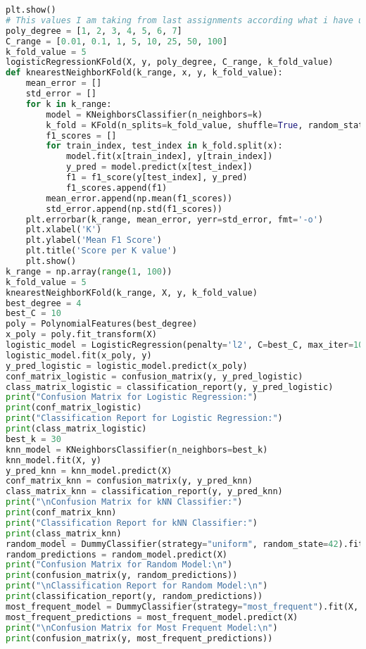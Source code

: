 \documentclass[a4paper,10pt]{article}
\begin{document}
\begin{lstlisting}[language=Python, caption={}]
    plt.show()
# This values I am taking from last assignments according what i have understand    
poly_degree = [1, 2, 3, 4, 5, 6, 7]
C_range = [0.01, 0.1, 1, 5, 10, 25, 50, 100]
k_fold_value = 5
logisticRegressionKFold(X, y, poly_degree, C_range, k_fold_value)
def knearestNeighborKFold(k_range, x, y, k_fold_value):
    mean_error = []
    std_error = []   
    for k in k_range:
        model = KNeighborsClassifier(n_neighbors=k)
        k_fold = KFold(n_splits=k_fold_value, shuffle=True, random_state=42)
        f1_scores = []
        for train_index, test_index in k_fold.split(x):        
            model.fit(x[train_index], y[train_index])
            y_pred = model.predict(x[test_index])
            f1 = f1_score(y[test_index], y_pred)
            f1_scores.append(f1)
        mean_error.append(np.mean(f1_scores))
        std_error.append(np.std(f1_scores))
    plt.errorbar(k_range, mean_error, yerr=std_error, fmt='-o')
    plt.xlabel('K')
    plt.ylabel('Mean F1 Score')
    plt.title('Score per K value')
    plt.show()
k_range = np.array(range(1, 100))
k_fold_value = 5
knearestNeighborKFold(k_range, X, y, k_fold_value)
best_degree = 4
best_C = 10
poly = PolynomialFeatures(best_degree)
x_poly = poly.fit_transform(X)
logistic_model = LogisticRegression(penalty='l2', C=best_C, max_iter=1000)
logistic_model.fit(x_poly, y)
y_pred_logistic = logistic_model.predict(x_poly)
conf_matrix_logistic = confusion_matrix(y, y_pred_logistic)
class_matrix_logistic = classification_report(y, y_pred_logistic)
print("Confusion Matrix for Logistic Regression:")
print(conf_matrix_logistic)
print("Classification Report for Logistic Regression:")
print(class_matrix_logistic)
best_k = 30
knn_model = KNeighborsClassifier(n_neighbors=best_k)
knn_model.fit(X, y)
y_pred_knn = knn_model.predict(X)
conf_matrix_knn = confusion_matrix(y, y_pred_knn)
class_matrix_knn = classification_report(y, y_pred_knn)
print("\nConfusion Matrix for kNN Classifier:")
print(conf_matrix_knn)
print("Classification Report for kNN Classifier:")
print(class_matrix_knn)
random_model = DummyClassifier(strategy="uniform", random_state=42).fit(X, y)
random_predictions = random_model.predict(X)
print("Confusion Matrix for Random Model:\n")
print(confusion_matrix(y, random_predictions))
print("\nClassification Report for Random Model:\n")
print(classification_report(y, random_predictions))
most_frequent_model = DummyClassifier(strategy="most_frequent").fit(X, y)
most_frequent_predictions = most_frequent_model.predict(X)
print("\nConfusion Matrix for Most Frequent Model:\n")
print(confusion_matrix(y, most_frequent_predictions))

\end{lstlisting}
\end{document}
